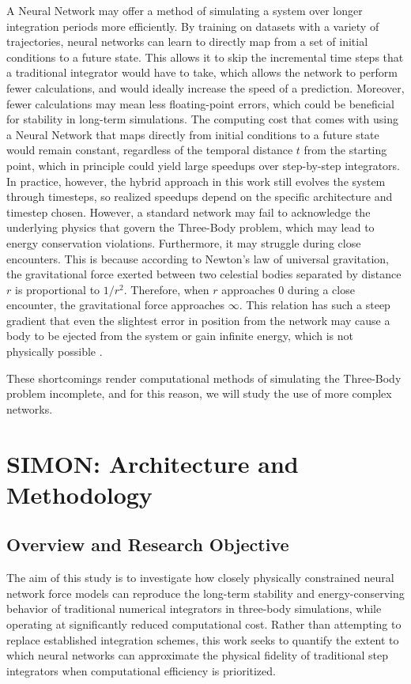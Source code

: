 \documentclass[12pt,a4paper]{article}
\begin{document}
A Neural Network may offer a method of simulating a system over longer integration periods more efficiently. By training on datasets with a variety of trajectories, neural networks can learn to directly map from a set of initial conditions to a future state. This allows it to skip the incremental time steps that a traditional integrator would have to take, which allows the network to perform fewer calculations, and would ideally increase the speed of a prediction. Moreover, fewer calculations may mean less floating-point errors, which could be beneficial for stability in long-term simulations. The computing cost that comes with using a Neural Network that maps directly from initial conditions to a future state would remain constant, regardless of the temporal distance $t$ from the starting point, which in principle could yield large speedups over step-by-step integrators. In practice, however, the hybrid approach in this work still evolves the system through timesteps, so realized speedups depend on the specific architecture and timestep chosen. However, a standard network may fail to acknowledge the underlying physics that govern the Three-Body problem, which may lead to energy conservation violations. Furthermore, it may struggle during close encounters. This is because according to Newton's law of universal gravitation, the gravitational force exerted between two celestial bodies separated by distance $r$ is proportional to $1/r^2$. Therefore, when $r$ approaches $0$ during a close encounter, the gravitational force approaches $\infty$. This relation has such a steep gradient that even the slightest error in position from the network may cause a body to be ejected from the system or gain infinite energy, which is not physically possible \cite{Dehnen2001}.

These shortcomings render computational methods of simulating the Three-Body problem incomplete, and for this reason, we will study the use of more complex networks.

\section{SIMON: Architecture and Methodology}
\label{sec:methodology}

\subsection{Overview and Research Objective}
\label{research_obj}
The aim of this study is to investigate how closely physically constrained neural network force models can reproduce the long-term stability and energy-conserving behavior of traditional numerical integrators in three-body simulations, while operating at significantly reduced computational cost. Rather than attempting to replace established integration schemes, this work seeks to quantify the extent to which neural networks can approximate the physical fidelity of traditional step integrators when computational efficiency is prioritized.
\end{document}
